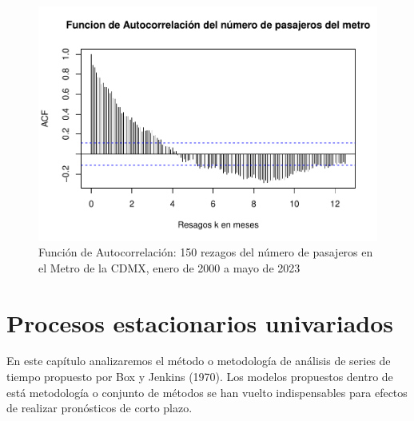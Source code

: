 \documentclass[
]{book}
\newenvironment{Shaded}{\begin{snugshade}}{\end{snugshade}}
\newcommand{\AttributeTok}[1]{\textcolor[rgb]{0.13,0.29,0.53}{#1}}
\newcommand{\DecValTok}[1]{\textcolor[rgb]{0.00,0.00,0.81}{#1}}
\newcommand{\FunctionTok}[1]{\textcolor[rgb]{0.13,0.29,0.53}{\textbf{#1}}}
\newcommand{\NormalTok}[1]{#1}
\newcommand{\OtherTok}[1]{\textcolor[rgb]{0.56,0.35,0.01}{#1}}
\newcommand{\SpecialCharTok}[1]{\textcolor[rgb]{0.81,0.36,0.00}{\textbf{#1}}}
\newcommand{\StringTok}[1]{\textcolor[rgb]{0.31,0.60,0.02}{#1}}
\begin{document}
\begin{Shaded}
\end{Shaded}

\begin{figure}

{\centering \includegraphics{Notas-Series-Tiempo_files/figure-latex/fig33-1} 

}

\caption{Función de Autocorrelación: 150 rezagos del número de pasajeros en el Metro de la CDMX, enero de 2000 a mayo de 2023}\label{fig:fig33}
\end{figure}

\hypertarget{procesos-estacionarios-univariados}{%
\chapter{Procesos estacionarios univariados}\label{procesos-estacionarios-univariados}}

En este capítulo analizaremos el método o metodología de análisis de series de tiempo propuesto por Box y Jenkins (1970). Los modelos
propuestos dentro de está metodología o conjunto de métodos se han vuelto indispensables para efectos de realizar pronósticos de corto
plazo.
\end{document}
